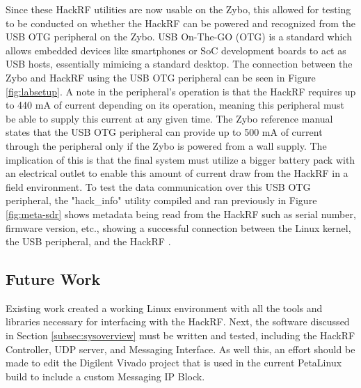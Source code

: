\documentclass[conference]{IEEEtran}
\begin{document}
Since these HackRF utilities are now usable on the Zybo, this allowed for testing to be conducted on whether the HackRF can be powered and recognized from the USB OTG peripheral on the Zybo. USB On-The-GO (OTG) is a standard which allows embedded devices like smartphones or SoC development boards to act as USB hosts, essentially mimicing a standard desktop. The connection between the Zybo and HackRF using the USB OTG peripheral can be seen in Figure \ref{fig:labsetup}. A note in the peripheral's operation is that the HackRF requires up to 440 mA of current depending on its operation, meaning this peripheral must be able to supply this current at any given time. The Zybo reference manual states that the USB OTG peripheral can provide up to 500 mA of current through the peripheral only if the Zybo is powered from a wall supply. The implication of this is that the final system must utilize a bigger battery pack with an electrical outlet to enable this amount of current draw from the HackRF in a field environment. To test the data communication over this USB OTG peripheral, the "hack\_info" utility compiled and ran previously in Figure \ref{fig:meta-sdr} shows metadata being read from the HackRF such as serial number, firmware version, etc., showing a successful connection between the Linux kernel, the USB peripheral, and the HackRF \cite{digilent_zybo_manual,hackrf_docs}.

\subsection{Future Work}
Existing work created a working Linux environment with all the tools and libraries necessary for interfacing with the HackRF. Next, the software discussed in Section \ref{subsec:sysoverview} must be written and tested, including the HackRF Controller, UDP server, and Messaging Interface. As well this, an effort should be made to edit the Digilent Vivado project that is used in the current PetaLinux build to include a custom Messaging IP Block.

\nocite{*}

\end{document}
